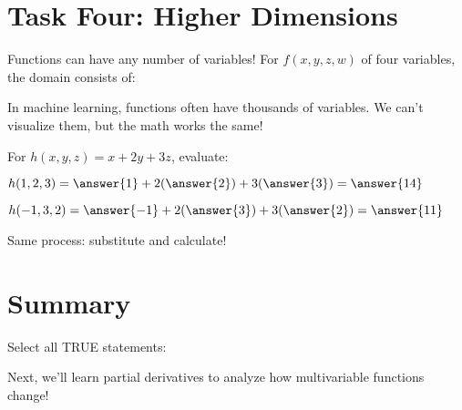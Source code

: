\documentclass{ximera}
\begin{document}
\section*{Task Four: Higher Dimensions}

\begin{problem}
Functions can have any number of variables! For $f(x, y, z, w)$ of four variables, the domain consists of:
\begin{multipleChoice}
\end{multipleChoice}

\begin{feedback}
In machine learning, functions often have thousands of variables. We can't visualize them, but the math works the same!
\end{feedback}
\end{problem}

\begin{problem}
For $h(x, y, z) = x + 2y + 3z$, evaluate:

$h(1, 2, 3) = \answer{1} + 2(\answer{2}) + 3(\answer{3}) = \answer{14}$

$h(-1, 3, 2) = \answer{-1} + 2(\answer{3}) + 3(\answer{2}) = \answer{11}$

\begin{feedback}
Same process: substitute and calculate!
\end{feedback}
\end{problem}

\section*{Summary}

\begin{problem}
Select all TRUE statements:

\begin{selectAll}
\end{selectAll}

\begin{feedback}
Next, we'll learn partial derivatives to analyze how multivariable functions change!
\end{feedback}
\end{problem}
\end{document}
